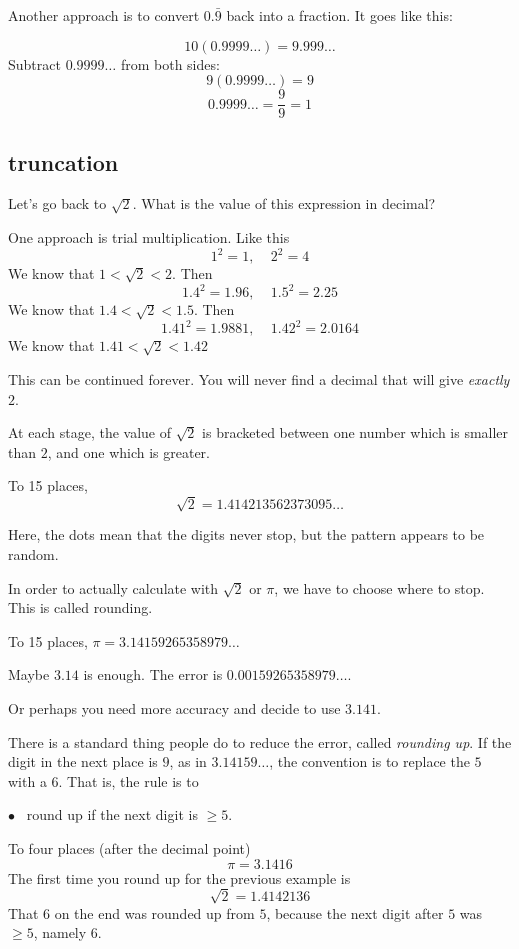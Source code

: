 \documentclass[11pt, oneside]{article}
\begin{document}
Another approach is to convert $0.\bar{9}$ back into a fraction.  It goes like this:

\[ 10 (0.9999 \dots) = 9.999 \dots \]
Subtract $0.9999 \dots$ from both sides:
\[ 9 (0.9999 \dots) = 9 \]
\[ 0.9999 \dots = \frac{9}{9} = 1 \]

\subsection*{truncation}

Let's go back to $\sqrt{2}$.  What is the value of this expression in decimal?

One approach is trial multiplication.  Like this
\[ 1^2 = 1, \ \ \ \ \ 2^2 = 4 \]
We know that $1 < \sqrt{2} < 2$.  Then
\[ 1.4^2 = 1.96, \ \ \ \ \ 1.5^2 = 2.25 \]
We know that $1.4 < \sqrt{2} < 1.5$.  Then
\[ 1.41^2 = 1.9881, \ \ \ \ \ 1.42^2 = 2.0164 \]
We know that $1.41 < \sqrt{2} < 1.42$

This can be continued forever.  You will never find a decimal that will give \emph{exactly} $2$.

At each stage, the value of $\sqrt{2}$ is bracketed between one number which is smaller than $2$, and one which is greater.

To 15 places, 
\[ \sqrt{2} = 1.414213562373095 \dots \]

Here, the dots mean that the digits never stop, but the pattern appears to be random.

In order to actually calculate with $\sqrt{2}$ or $\pi$, we have to choose where to stop.  This is called rounding.

To 15 places, $\pi = 3.14159265358979 \dots$

Maybe $3.14$ is enough.  The error is $0.00159265358979 \dots$.

Or perhaps you need more accuracy and decide to use $3.141$.

There is a standard thing people do to reduce the error, called \emph{rounding up}.  If the digit in the next place is $9$, as in $3.14159 \dots$, the convention is to replace the $5$ with a $6$.  That is, the rule is to 

$\bullet$ \ round up if the next digit is $\ge 5$.  

To four places (after the decimal point)
\[ \pi = 3.1416 \]
The first time you round up for the previous example is
\[ \sqrt{2} = 1.4142136 \]
That $6$ on the end was rounded up from $5$, because the next digit after $5$ was $\ge 5$, namely $6$.
\end{document}
